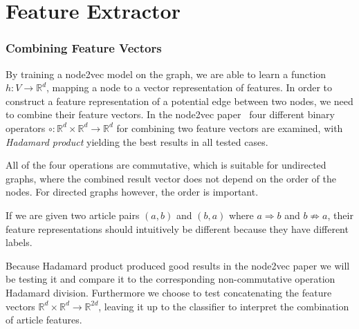 \section{Feature Extractor}\label{feature_extractor}



\subsubsection{Combining Feature Vectors}
By training a node2vec model on the graph, we are able to learn a function $h:V \to \mathbb{R}^d$, mapping a node to a vector representation of features. In order to construct a feature representation of a potential edge between two nodes, we need to combine their feature vectors. In the node2vec paper~\cite{node2vec} four different binary operators $\circ : \mathbb{R}^d \times \mathbb{R}^d \to \mathbb{R}^d$ for combining two feature vectors are examined, with \emph{Hadamard product} yielding the best results in all tested cases.


All of the four operations are commutative, which is suitable for undirected graphs, where the combined result vector does not depend on the order of the nodes. For directed graphs however, the order is important.


If we are given two article pairs $(a,b)$ and $(b,a)$ where $a \Rightarrow b$ and $b \not \Rightarrow a$, their feature representations should intuitively be different because they have different labels.


Because Hadamard product produced good results in the node2vec paper we will be testing it and compare it to the corresponding non-commutative operation Hadamard division. Furthermore we choose to test concatenating the feature vectors $\mathbb{R}^d \times \mathbb{R}^d \to \mathbb{R}^{2d}$, leaving it up to the classifier to interpret the combination of article features.

